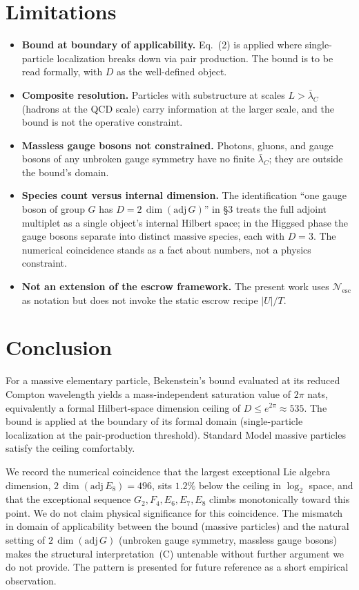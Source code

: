 \documentclass[11pt]{article}
\newcommand{\Nesc}{\mathcal{N}_{\mathrm{esc}}}
\newcommand{\lbar}{\bar\lambda_{C}}
\begin{document}
\section{Limitations}
\begin{itemize}
\item[\textbf{(a)}] \textbf{Bound at boundary of applicability.} Eq.~(2) is applied where
single-particle localization breaks down via pair production. The bound is to be read formally, with
$D$ as the well-defined object.
\item[\textbf{(b)}] \textbf{Composite resolution.} Particles with substructure at scales
$L > \lbar$ (hadrons at the QCD scale) carry information at the larger scale, and the bound is not the
operative constraint.
\item[\textbf{(c)}] \textbf{Massless gauge bosons not constrained.} Photons, gluons, and gauge bosons
of any unbroken gauge symmetry have no finite $\lbar$; they are outside the bound's domain.
\item[\textbf{(d)}] \textbf{Species count versus internal dimension.} The identification ``one gauge
boson of group $G$ has $D = 2\,\dim(\mathrm{adj}\,G)$'' in \S3 treats the full adjoint multiplet as a
single object's internal Hilbert space; in the Higgsed phase the gauge bosons separate into distinct
massive species, each with $D = 3$. The numerical coincidence stands as a fact about numbers, not a
physics constraint.
\item[\textbf{(e)}] \textbf{Not an extension of the escrow framework.} The present work uses $\Nesc$
as notation but does not invoke the static escrow recipe $|U|/T$.
\end{itemize}

\section{Conclusion}

For a massive elementary particle, Bekenstein's bound evaluated at its reduced Compton wavelength
yields a mass-independent saturation value of $2\pi$ nats, equivalently a formal Hilbert-space dimension
ceiling of $D \le e^{2\pi} \approx 535$. The bound is applied at the boundary of its formal domain
(single-particle localization at the pair-production threshold). Standard Model massive particles
satisfy the ceiling comfortably.

We record the numerical coincidence that the largest exceptional Lie algebra dimension,
$2\,\dim(\mathrm{adj}\,E_{8}) = 496$, sits $1.2\%$ below the ceiling in $\log_{2}$ space, and that the
exceptional sequence $G_{2}, F_{4}, E_{6}, E_{7}, E_{8}$ climbs monotonically toward this point. We do
not claim physical significance for this coincidence. The mismatch in domain of applicability between
the bound (massive particles) and the natural setting of $2\,\dim(\mathrm{adj}\,G)$ (unbroken gauge
symmetry, massless gauge bosons) makes the structural interpretation~(C) untenable without further
argument we do not provide. The pattern is presented for future reference as a short empirical
observation.
\end{document}
